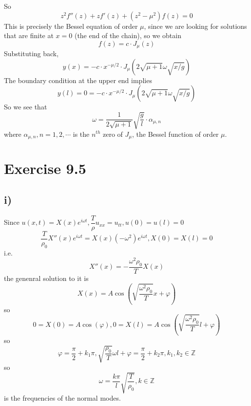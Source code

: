 \documentclass[a4paper,12pt,titlepage]{article}
\begin{document}
So
$$z^2f''(z)+zf'(z)+(z^2-\mu^2)f(z)=0$$
This is precisely the Bessel equation of order $\mu$, since we are looking for solutions that are finite at $x = 0$ (the end of the
chain), so we obtain
$$f(z)=c\cdot J_{\mu}(z)$$
Substituting back,
$$y(x)=-c\cdot x^{-\mu/2}\cdot J_{\mu}(2\sqrt{\mu+1}\omega\sqrt{x/g})$$
The boundary condition at the upper end implies
$$y(l)=0=-c\cdot x^{-\mu/2}\cdot J_{\mu}(2\sqrt{\mu+1}\omega\sqrt{x/g})$$
So we see that
$$\omega=\dfrac{1}{2\sqrt{\mu+1}}\sqrt{\frac{g}{l}}\cdot\alpha_{\mu,n}$$
where $\alpha_{\mu,n}, n = 1, 2,\cdots$ is the $n^{th}$ zero of $J_{\mu}$, the Bessel function of order $\mu$.

\section*{Exercise 9.5}
\subsection*{i)}
Since $u(x,t) = X(x)e^{i\omega t},\dfrac{T}{\rho}u_{xx}=u_{tt},u(0)=u(l)=0$
$$\dfrac{T}{\rho_0}X''(x)e^{i\omega t}=X(x)(-\omega^2)e^{i\omega t},X(0)=X(l)=0$$
i.e.
$$X''(x)=-\dfrac{\omega^2\rho_0}{T}X(x)$$
the genenral solution to it is
$$X(x)=A\cos(\sqrt{\dfrac{\omega^2\rho_0}{T}}x+\varphi)$$
so
$$0=X(0)=A\cos(\varphi),0=X(l)=A\cos(\sqrt{\dfrac{\omega^2\rho_0}{T}}l+\varphi)$$
so
$$\varphi=\dfrac{\pi}{2}+k_1\pi,\sqrt{\dfrac{\rho_0}{T}}\omega l+\varphi=\dfrac{\pi}{2}+k_2\pi,k_1,k_2\in\mathbb{Z}$$
so
$$\omega=\dfrac{k\pi}{l}\sqrt{\dfrac{T}{\rho_0}},k\in\mathbb{Z}$$
is the frequencies of the normal modes.
\end{document}
